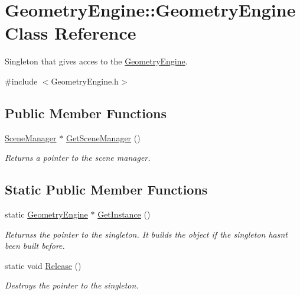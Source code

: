 \hypertarget{class_geometry_engine_1_1_geometry_engine}{}\section{Geometry\+Engine\+::Geometry\+Engine Class Reference}
\label{class_geometry_engine_1_1_geometry_engine}


Singleton that gives acces to the \mbox{\hyperlink{class_geometry_engine_1_1_geometry_engine}{Geometry\+Engine}}.  




{\ttfamily \#include $<$Geometry\+Engine.\+h$>$}

\subsection*{Public Member Functions}
\begin{DoxyCompactItemize}
\item 
\mbox{\label{class_geometry_engine_1_1_geometry_engine_a05ef74c582d54368b8df90b84a889f73}} 
\mbox{\hyperlink{class_geometry_engine_1_1_scene_manager}{Scene\+Manager}} $\ast$ \mbox{\hyperlink{class_geometry_engine_1_1_geometry_engine_a05ef74c582d54368b8df90b84a889f73}{Get\+Scene\+Manager}} ()
\begin{DoxyCompactList}\small\item\em Returns a pointer to the scene manager. \end{DoxyCompactList}\end{DoxyCompactItemize}
\subsection*{Static Public Member Functions}
\begin{DoxyCompactItemize}
\item 
\mbox{\label{class_geometry_engine_1_1_geometry_engine_ad3db079180166e79c3f37d8d487f2c29}} 
static \mbox{\hyperlink{class_geometry_engine_1_1_geometry_engine}{Geometry\+Engine}} $\ast$ \mbox{\hyperlink{class_geometry_engine_1_1_geometry_engine_ad3db079180166e79c3f37d8d487f2c29}{Get\+Instance}} ()
\begin{DoxyCompactList}\small\item\em Returnss the pointer to the singleton. It builds the object if the singleton hasn\textquotesingle{}t been built before. \end{DoxyCompactList}\item 
\mbox{\label{class_geometry_engine_1_1_geometry_engine_a2c2e044075bfe61e6e18a07061072172}} 
static void \mbox{\hyperlink{class_geometry_engine_1_1_geometry_engine_a2c2e044075bfe61e6e18a07061072172}{Release}} ()
\begin{DoxyCompactList}\small\item\em Destroys the pointer to the singleton. \end{DoxyCompactList}\end{DoxyCompactItemize}
